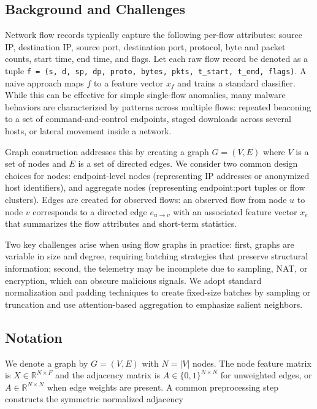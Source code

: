 \documentclass[conference]{IEEEtran}
\begin{document}
\subsection{Background and Challenges}

Network flow records typically capture the following per-flow attributes: source IP, destination IP, source port, destination port, protocol, byte and packet counts, start time, end time, and flags. Let each raw flow record be denoted as a tuple \texttt{f = (s, d, sp, dp, proto, bytes, pkts, t\_start, t\_end, flags)}. A naive approach maps $f$ to a feature vector $x_f$ and trains a standard classifier. While this can be effective for simple single-flow anomalies, many malware behaviors are characterized by patterns across multiple flows: repeated beaconing to a set of command-and-control endpoints, staged downloads across several hosts, or lateral movement inside a network.

Graph construction addresses this by creating a graph $G = (V, E)$ where $V$ is a set of nodes and $E$ is a set of directed edges. We consider two common design choices for nodes: endpoint-level nodes (representing IP addresses or anonymized host identifiers), and aggregate nodes (representing endpoint:port tuples or flow clusters). Edges are created for observed flows: an observed flow from node $u$ to node $v$ corresponds to a directed edge $e_{u\to v}$ with an associated feature vector $x_e$ that summarizes the flow attributes and short-term statistics.

Two key challenges arise when using flow graphs in practice: first, graphs are variable in size and degree, requiring batching strategies that preserve structural information; second, the telemetry may be incomplete due to sampling, NAT, or encryption, which can obscure malicious signals. We adopt standard normalization and padding techniques to create fixed-size batches by sampling or truncation and use attention-based aggregation to emphasize salient neighbors.

\subsection{Notation}

We denote a graph by $G = (V, E)$ with $N = |V|$ nodes. The node feature matrix is $X \in \mathbb{R}^{N \times F}$ and the adjacency matrix is $A \in \{0,1\}^{N \times N}$ for unweighted edges, or $A \in \mathbb{R}^{N \times N}$ when edge weights are present. A common preprocessing step constructs the symmetric normalized adjacency
\end{document}
